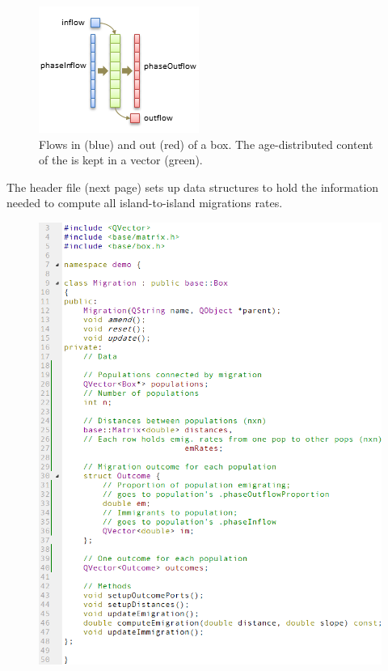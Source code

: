 \begin{figure} [hb]
\centering
\includegraphics[scale=1]{graphics/stage}
\caption{Flows in (blue) and out (red) of a  box. The age-distributed content of the  is kept in a vector (green).}
\label{fig:stage}
\end{figure}

The  header file (next page) sets up data structures to hold the information needed to compute all island-to-island migrations rates.

\begin{figure}
\centering
\includegraphics[scale=0.7,left]{graphics/migration-h}
\end{figure}

